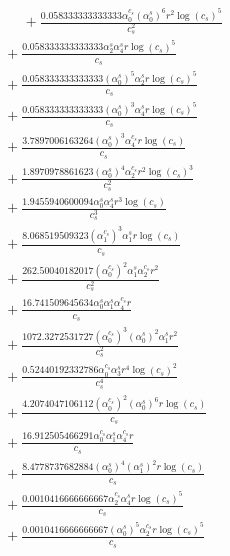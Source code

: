 \documentclass[10pt]{article}
\begin{document}
\begin{align*}
\phantom{R_{3,9}} &\phantom{={}}{}  + \frac{0.058333333333333 \alpha_{0}^{c_s} \left(\alpha_{0}^s\right)^{6} r^{2} \log{\left(c_{s} \right)}^{5}}{c_{s}^{2}} \\
&{}  + \frac{0.058333333333333 \alpha_{2}^s \alpha_{4}^s r \log{\left(c_{s} \right)}^{5}}{c_{s}} \\
&{}  + \frac{0.058333333333333 \left(\alpha_{0}^s\right)^{5} \alpha_{2}^s r \log{\left(c_{s} \right)}^{5}}{c_{s}} \\
&{}  + \frac{0.058333333333333 \left(\alpha_{0}^s\right)^{3} \alpha_{4}^s r \log{\left(c_{s} \right)}^{5}}{c_{s}} \\
&{}  + \frac{3.7897006163264 \left(\alpha_{0}^s\right)^{3} \alpha_{4}^{c_s} r \log{\left(c_{s} \right)}}{c_{s}} \\
&{}  + \frac{1.8970978861623 \left(\alpha_{0}^s\right)^{4} \alpha_{2}^{c_s} r^{2} \log{\left(c_{s} \right)}^{3}}{c_{s}^{2}} \\
&{}  + \frac{1.9455940600094 \alpha_{0}^s \alpha_{4}^s r^{3} \log{\left(c_{s} \right)}}{c_{s}^{3}} \\
&{}  + \frac{8.068519509323 \left(\alpha_{1}^{c_s}\right)^{3} \alpha_{1}^s r \log{\left(c_{s} \right)}}{c_{s}} \\
&{}  + \frac{262.50040182017 \left(\alpha_{0}^{c_s}\right)^{2} \alpha_{1}^s \alpha_{2}^{c_s} r^{2}}{c_{s}^{2}} \\
&{}  + \frac{16.741509645634 \alpha_{0}^s \alpha_{1}^s \alpha_{4}^{c_s} r}{c_{s}} \\
&{}  + \frac{1072.3272531727 \left(\alpha_{0}^{c_s}\right)^{3} \left(\alpha_{0}^s\right)^{2} \alpha_{1}^s r^{2}}{c_{s}^{2}} \\
&{}  + \frac{0.52440192332786 \alpha_{0}^{c_s} \alpha_{3}^s r^{4} \log{\left(c_{s} \right)}^{2}}{c_{s}^{4}} \\
&{}  + \frac{4.2074047106112 \left(\alpha_{0}^{c_s}\right)^{2} \left(\alpha_{0}^s\right)^{6} r \log{\left(c_{s} \right)}}{c_{s}} \\
&{}  + \frac{16.912505466291 \alpha_{0}^{c_s} \alpha_{1}^s \alpha_{4}^{c_s} r}{c_{s}} \\
&{}  + \frac{8.4778737682884 \left(\alpha_{0}^s\right)^{4} \left(\alpha_{1}^s\right)^{2} r \log{\left(c_{s} \right)}}{c_{s}} \\
&{}  + \frac{0.0010416666666667 \alpha_{2}^{c_s} \alpha_{4}^s r \log{\left(c_{s} \right)}^{5}}{c_{s}} \\
&{}  + \frac{0.0010416666666667 \left(\alpha_{0}^s\right)^{5} \alpha_{2}^{c_s} r \log{\left(c_{s} \right)}^{5}}{c_{s}} \\

\end{align*}
\end{document}
